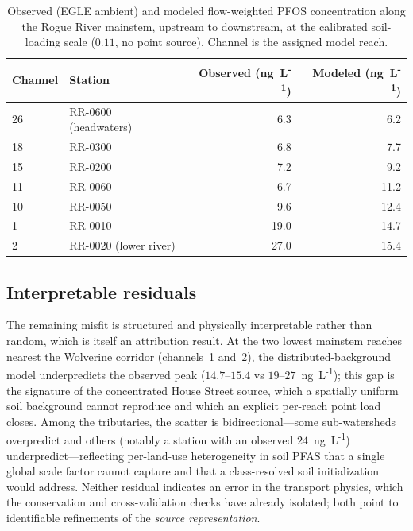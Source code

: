 \begin{table}[ht]
\centering
\caption{Observed (EGLE ambient) and modeled flow-weighted PFOS concentration along the Rogue River mainstem, upstream to downstream, at the calibrated soil-loading scale ($0.11$, no point source). Channel is the assigned model reach.}
\label{tab:gradient}
\begin{tabular}{llrr}
\toprule
Channel & Station & Observed (ng~L\textsuperscript{-1}) & Modeled (ng~L\textsuperscript{-1}) \\
\midrule
26 & RR-0600 (headwaters) & 6.3  & 6.2  \\
18 & RR-0300              & 6.8  & 7.7  \\
15 & RR-0200              & 7.2  & 9.2  \\
11 & RR-0060              & 6.7  & 11.2 \\
10 & RR-0050              & 9.6  & 12.4 \\
1  & RR-0010              & 19.0 & 14.7 \\
2  & RR-0020 (lower river)& 27.0 & 15.4 \\
\bottomrule
\end{tabular}
\end{table}

\subsection{Interpretable residuals}
The remaining misfit is structured and physically interpretable rather than random, which is itself an attribution result. At the two lowest mainstem reaches nearest the Wolverine corridor (channels~1 and~2), the distributed-background model underpredicts the observed peak ($14.7$--$15.4$ vs $19$--$27$~ng~L\textsuperscript{-1}); this gap is the signature of the concentrated House Street source, which a spatially uniform soil background cannot reproduce and which an explicit per-reach point load closes. Among the tributaries, the scatter is bidirectional---some sub-watersheds overpredict and others (notably a station with an observed $24$~ng~L\textsuperscript{-1}) underpredict---reflecting per-land-use heterogeneity in soil PFAS that a single global scale factor cannot capture and that a class-resolved soil initialization would address. Neither residual indicates an error in the transport physics, which the conservation and cross-validation checks have already isolated; both point to identifiable refinements of the \emph{source representation}.

